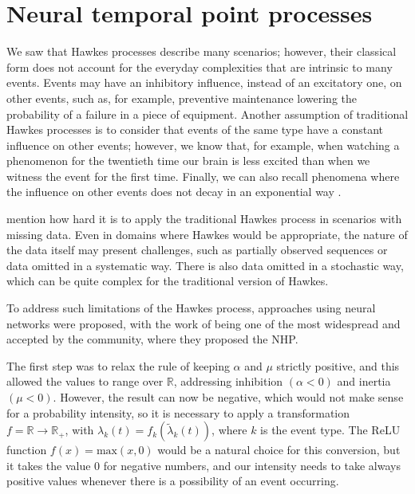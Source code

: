 \section{Neural temporal point processes}\label{sec:processos-pontuais-temporais-neurais}

    We saw that Hawkes processes describe many scenarios; however, their classical form does not account for the everyday complexities that are intrinsic to many events. Events may have an inhibitory influence, instead of an excitatory one, on other events, such as, for example, preventive maintenance lowering the probability of a failure in a piece of equipment. Another assumption of traditional Hawkes processes is to consider that events of the same type have a constant influence on other events; however, we know that, for example, when watching a phenomenon for the twentieth time our brain is less excited than when we witness the event for the first time. Finally, we can also recall phenomena where the influence on other events does not decay in an exponential way \cite{mei_neural_2017}.

     mention how hard it is to apply the traditional Hawkes process in scenarios with missing data. Even in domains where Hawkes would be appropriate, the nature of the data itself may present challenges, such as partially observed sequences or data omitted in a systematic way. There is also data omitted in a stochastic way, which can be quite complex for the traditional version of Hawkes.

    To address such limitations of the Hawkes process, approaches using neural networks were proposed, with the work of  being one of the most widespread and accepted by the community, where they proposed the \gls{NHP}.

    The first step was to relax the rule of keeping $\alpha$ and $\mu$ strictly positive, and this allowed the values to range over $\mathbb{R}$, addressing inhibition $(\alpha < 0)$ and inertia $(\mu < 0)$. However, the result can now be negative, which would not make sense for a probability intensity, so it is necessary to apply a transformation $f = \mathbb{R} \to \mathbb{R_+}$, with $\lambda_k(t) = f_k(\tilde \lambda_k(t))$, where $k$ is the event type. The ReLU function $f(x) = \mathrm{max}(x, 0)$ would be a natural choice for this conversion, but it takes the value 0 for negative numbers, and our intensity needs to take always positive values whenever there is a possibility of an event occurring.

